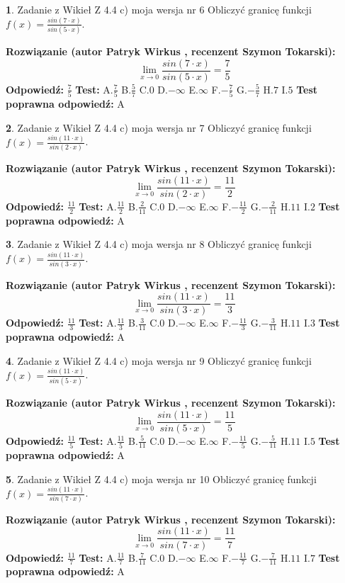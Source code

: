 \documentclass[12pt, a4paper]{article}
\theoremstyle{definition} %
\newtheorem{zad}{}
\newcommand{\zadStart}[1]{\begin{zad}#1\newline}
\newcommand{\zadStop}{\end{zad}}
\newcommand{\rozwStart}[2]{\noindent \textbf{Rozwiązanie (autor #1 , recenzent #2): }\newline}
\newcommand{\rozwStop}{\newline}
\newcommand{\odpStart}{\noindent \textbf{Odpowiedź:}\newline}
\newcommand{\odpStop}{\newline}
\newcommand{\testStart}{\noindent \textbf{Test:}\newline}
\newcommand{\testStop}{\newline}
\newcommand{\kluczStart}{\noindent \textbf{Test poprawna odpowiedź:}\newline}
\newcommand{\kluczStop}{\newline}
\begin{document}
\zadStart{Zadanie z Wikieł Z 4.4 c) moja wersja nr 6}
Obliczyć granicę funkcji $f(x)=\frac{sin(7\cdot x)}{sin(5\cdot x)}$.
\zadStop
\rozwStart{Patryk Wirkus}{Szymon Tokarski}
$$\lim\limits_{x\to 0}\frac{sin(7\cdot x)}{sin(5\cdot x)}=
\frac{7}{5}$$
\rozwStop
\odpStart
$\frac{7}{5}$
\odpStop
\testStart
A.$\frac{7}{5}$
B.$\frac{5}{7}$
C.$0$
D.$-\infty$
E.$\infty$
F.$-\frac{7}{5}$
G.$-\frac{5}{7}$
H.$7$
I.$5$
\testStop
\kluczStart
A
\kluczStop



\zadStart{Zadanie z Wikieł Z 4.4 c) moja wersja nr 7}
Obliczyć granicę funkcji $f(x)=\frac{sin(11\cdot x)}{sin(2\cdot x)}$.
\zadStop
\rozwStart{Patryk Wirkus}{Szymon Tokarski}
$$\lim\limits_{x\to 0}\frac{sin(11\cdot x)}{sin(2\cdot x)}=
\frac{11}{2}$$
\rozwStop
\odpStart
$\frac{11}{2}$
\odpStop
\testStart
A.$\frac{11}{2}$
B.$\frac{2}{11}$
C.$0$
D.$-\infty$
E.$\infty$
F.$-\frac{11}{2}$
G.$-\frac{2}{11}$
H.$11$
I.$2$
\testStop
\kluczStart
A
\kluczStop



\zadStart{Zadanie z Wikieł Z 4.4 c) moja wersja nr 8}
Obliczyć granicę funkcji $f(x)=\frac{sin(11\cdot x)}{sin(3\cdot x)}$.
\zadStop
\rozwStart{Patryk Wirkus}{Szymon Tokarski}
$$\lim\limits_{x\to 0}\frac{sin(11\cdot x)}{sin(3\cdot x)}=
\frac{11}{3}$$
\rozwStop
\odpStart
$\frac{11}{3}$
\odpStop
\testStart
A.$\frac{11}{3}$
B.$\frac{3}{11}$
C.$0$
D.$-\infty$
E.$\infty$
F.$-\frac{11}{3}$
G.$-\frac{3}{11}$
H.$11$
I.$3$
\testStop
\kluczStart
A
\kluczStop



\zadStart{Zadanie z Wikieł Z 4.4 c) moja wersja nr 9}
Obliczyć granicę funkcji $f(x)=\frac{sin(11\cdot x)}{sin(5\cdot x)}$.
\zadStop
\rozwStart{Patryk Wirkus}{Szymon Tokarski}
$$\lim\limits_{x\to 0}\frac{sin(11\cdot x)}{sin(5\cdot x)}=
\frac{11}{5}$$
\rozwStop
\odpStart
$\frac{11}{5}$
\odpStop
\testStart
A.$\frac{11}{5}$
B.$\frac{5}{11}$
C.$0$
D.$-\infty$
E.$\infty$
F.$-\frac{11}{5}$
G.$-\frac{5}{11}$
H.$11$
I.$5$
\testStop
\kluczStart
A
\kluczStop



\zadStart{Zadanie z Wikieł Z 4.4 c) moja wersja nr 10}
Obliczyć granicę funkcji $f(x)=\frac{sin(11\cdot x)}{sin(7\cdot x)}$.
\zadStop
\rozwStart{Patryk Wirkus}{Szymon Tokarski}
$$\lim\limits_{x\to 0}\frac{sin(11\cdot x)}{sin(7\cdot x)}=
\frac{11}{7}$$
\rozwStop
\odpStart
$\frac{11}{7}$
\odpStop
\testStart
A.$\frac{11}{7}$
B.$\frac{7}{11}$
C.$0$
D.$-\infty$
E.$\infty$
F.$-\frac{11}{7}$
G.$-\frac{7}{11}$
H.$11$
I.$7$
\testStop
\kluczStart
A
\kluczStop
\end{document}
